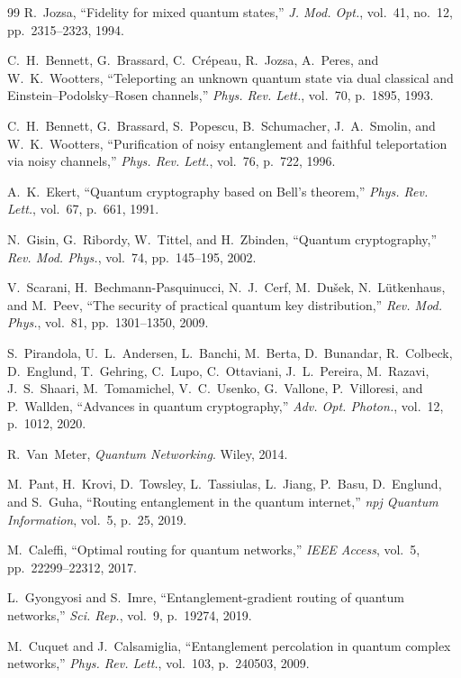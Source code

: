 \documentclass[twocolumn]{article}
\begin{document}
\begin{thebibliography}{99}
R.~Jozsa, ``Fidelity for mixed quantum states,''
\emph{J. Mod. Opt.}, vol.~41, no.~12, pp.~2315--2323, 1994.

C.~H.~Bennett, G.~Brassard, C.~Cr\'epeau, R.~Jozsa, A.~Peres, and
W.~K.~Wootters,
``Teleporting an unknown quantum state via dual classical and
Einstein--Podolsky--Rosen channels,''
\emph{Phys. Rev. Lett.}, vol.~70, p.~1895, 1993.

C.~H.~Bennett, G.~Brassard, S.~Popescu, B.~Schumacher, J.~A.~Smolin,
and W.~K.~Wootters,
``Purification of noisy entanglement and faithful teleportation via
noisy channels,''
\emph{Phys. Rev. Lett.}, vol.~76, p.~722, 1996.

A.~K.~Ekert, ``Quantum cryptography based on Bell's theorem,''
\emph{Phys. Rev. Lett.}, vol.~67, p.~661, 1991.

N.~Gisin, G.~Ribordy, W.~Tittel, and H.~Zbinden,
``Quantum cryptography,''
\emph{Rev. Mod. Phys.}, vol.~74, pp.~145--195, 2002.

V.~Scarani, H.~Bechmann-Pasquinucci, N.~J.~Cerf, M.~Du\v{s}ek,
N.~L\"utkenhaus, and M.~Peev,
``The security of practical quantum key distribution,''
\emph{Rev. Mod. Phys.}, vol.~81, pp.~1301--1350, 2009.

S.~Pirandola, U.~L.~Andersen, L.~Banchi, M.~Berta, D.~Bunandar,
R.~Colbeck, D.~Englund, T.~Gehring, C.~Lupo, C.~Ottaviani,
J.~L.~Pereira, M.~Razavi, J.~S.~Shaari, M.~Tomamichel,
V.~C.~Usenko, G.~Vallone, P.~Villoresi, and P.~Wallden,
``Advances in quantum cryptography,''
\emph{Adv. Opt. Photon.}, vol.~12, p.~1012, 2020.

R.~Van~Meter, \emph{Quantum Networking}.  Wiley, 2014.

M.~Pant, H.~Krovi, D.~Towsley, L.~Tassiulas, L.~Jiang, P.~Basu,
D.~Englund, and S.~Guha,
``Routing entanglement in the quantum internet,''
\emph{npj Quantum Information}, vol.~5, p.~25, 2019.

M.~Caleffi, ``Optimal routing for quantum networks,''
\emph{IEEE Access}, vol.~5, pp.~22299--22312, 2017.

L.~Gyongyosi and S.~Imre,
``Entanglement-gradient routing of quantum networks,''
\emph{Sci. Rep.}, vol.~9, p.~19274, 2019.

M.~Cuquet and J.~Calsamiglia,
``Entanglement percolation in quantum complex networks,''
\emph{Phys. Rev. Lett.}, vol.~103, p.~240503, 2009.


\end{thebibliography}
\end{document}

